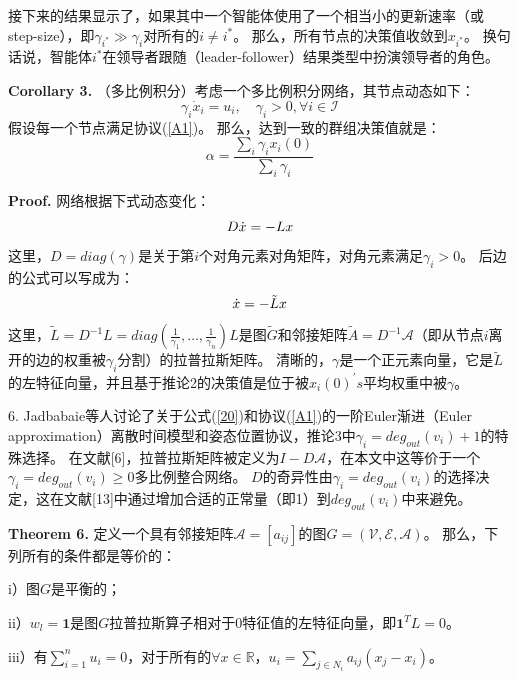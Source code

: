 \documentclass{article}
\begin{document}
接下来的结果显示了，如果其中一个智能体使用了一个相当小的更新速率（或step-size），即$\gamma_{i^*}\gg\gamma_i$对所有的$i\ne i^*$。
那么，所有节点的决策值收敛到$x_{i^*}$。
换句话说，智能体$i^*$在领导者跟随（leader-follower）结果类型中扮演领导者的角色。

\noindent \textbf{Corollary 3.} （多比例积分）考虑一个多比例积分网络，其节点动态如下：
\begin{equation}
    \gamma_i \dot{x}_i=u_i,\quad \gamma_i>0,\forall i \in \mathcal{I}
    \tag{20}
    \label{20}
\end{equation}
假设每一个节点满足协议(\ref{A1})。
那么，达到一致的群组决策值就是：
\begin{equation}
    \alpha = \frac{\sum_i \gamma_ix_i(0)}{\sum_i\gamma_i}
    \tag{21}
    \label{21}
\end{equation}

\noindent \textbf{Proof.} 网络根据下式动态变化：
\begin{equation}
    D\dot{x} = -Lx
    \notag
\end{equation}
这里，$D=diag(\gamma)$是关于第$i$个对角元素对角矩阵，对角元素满足$\gamma_i>0$。
后边的公式可以写成为：
\begin{equation}
    \dot{x} = -\tilde{L}x
    \notag
\end{equation}
这里，$\tilde{L} = D^{-1}L = diag(\frac{1}{\gamma_1},\dots,\frac{1}{\gamma_n})L$是图$\tilde{G}$和邻接矩阵$\tilde{A}=D^{-1}\mathcal{A}$（即从节点$i$离开的边的权重被$\gamma_i$分割）的拉普拉斯矩阵。
清晰的，$\gamma$是一个正元素向量，它是$\tilde{L}$的左特征向量，并且基于推论2的决策值是位于被$x_i(0)^\prime s$平均权重中被$\gamma$。

 6. Jadbabaie等人讨论了关于公式(\ref{20})和协议(\ref{A1})的一阶Euler渐进（Euler approximation）离散时间模型和姿态位置协议，推论3中$\gamma_i=deg_{out}(v_i)+1$的特殊选择。
在文献[6]，拉普拉斯矩阵被定义为$I-D\mathcal{A}$，在本文中这等价于一个$\gamma_i=deg_{out}(v_i)\ge 0$多比例整合网络。
$D$的奇异性由$\gamma_i=deg_{out}(v_i)$的选择决定，这在文献[13]中通过增加合适的正常量（即1）到$deg_{out}(v_i)$中来避免。

\noindent \textbf{Theorem 6.} 定义一个具有邻接矩阵$\mathcal{A}=[a_{ij}]$的图$G=(\mathcal{V}, \mathcal{E}, \mathcal{A})$。
那么，下列所有的条件都是等价的：

i）图$G$是平衡的；

ii）$w_l = \mathbf{1}$是图$G$拉普拉斯算子相对于0特征值的左特征向量，即$\mathbf{1}^TL = 0$。

iii）有$\sum_{i=1}^n u_i = 0$，对于所有的$\forall x \in \mathbb{R}$，$u_i = \sum_{j\in N_i}a_{ij}(x_j - x_i)$。
\end{document}
